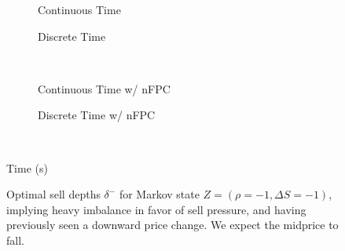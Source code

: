 \begin{figure}
\centering
\begin{subfigure}{.45\linewidth}
  \centering
  \setlength\figureheight{\linewidth} 
  \setlength\figurewidth{\linewidth}
  
  \caption{Continuous Time}
\end{subfigure}%
\hfill%
\begin{subfigure}{.45\linewidth}
  \centering
  \setlength\figureheight{\linewidth} 
  \setlength\figurewidth{\linewidth}
   
  \caption{Discrete Time}
\end{subfigure}\\
\vspace{1cm}
\begin{subfigure}{.45\linewidth}
  \centering
  \setlength\figureheight{\linewidth} 
  \setlength\figurewidth{\linewidth}
   
  \caption{Continuous Time w/ nFPC}
\end{subfigure}%
\hfill%
\begin{subfigure}{.45\linewidth}
  \centering
  \setlength\figureheight{\linewidth} 
  \setlength\figurewidth{\linewidth}
   
  \caption{Discrete Time w/ nFPC}
\end{subfigure}\\

\leavevmode{}\hspace{0pt plus 1filll}\null

Time (s)

\vspace{1cm}
\begin{subfigure}{\linewidth}
  \centering
   
\end{subfigure}%
  \caption{Optimal sell depths $\delta^{-}$ for Markov state $Z=(\rho = -1, \Delta S = -1)$, implying heavy imbalance in favor of sell pressure, and having previously seen a downward price change. We expect the midprice to fall.}
  \label{fig:comp_dm_z1}
\end{figure}

